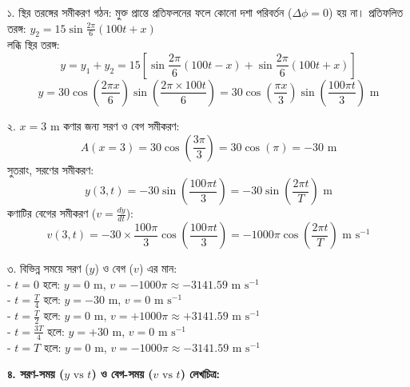 \documentclass[12pt, a4paper]{article}
\begin{document}
\begin{tcolorbox}[solutionbox={সমাধান (Solution)}]
\noindent
১. স্থির তরঙ্গের সমীকরণ গঠন: মুক্ত প্রান্তে প্রতিফলনের ফলে কোনো দশা পরিবর্তন ($\Delta \phi = 0$) হয় না। প্রতিফলিত তরঙ্গ: $y_2 = 15 \sin \frac{2\pi}{6}(100t + x)$ \\
লব্ধি স্থির তরঙ্গ:
\[ y = y_1 + y_2 = 15 \left[ \sin \frac{2\pi}{6}(100t - x) + \sin \frac{2\pi}{6}(100t + x) \right] \]
\[ y = 30 \cos\left(\frac{2\pi x}{6}\right) \sin\left(\frac{2\pi \times 100t}{6}\right) = 30 \cos\left(\frac{\pi x}{3}\right) \sin\left(\frac{100\pi t}{3}\right)\text{ m} \]

\noindent
২. $x = 3\text{ m}$ কণার জন্য সরণ ও বেগ সমীকরণ:
\[ A(x=3) = 30 \cos\left(\frac{3\pi}{3}\right) = 30 \cos(\pi) = -30\text{ m} \]
সুতরাং, সরণের সমীকরণ: 
\[ y(3, t) = -30 \sin\left(\frac{100\pi t}{3}\right) = -30 \sin\left(\frac{2\pi t}{T}\right)\text{ m} \]
কণাটির বেগের সমীকরণ ($v = \frac{dy}{dt}$):
\[ v(3, t) = -30 \times \frac{100\pi}{3} \cos\left(\frac{100\pi t}{3}\right) = -1000\pi \cos\left(\frac{2\pi t}{T}\right)\text{ m s}^{-1} \]

\noindent
৩. বিভিন্ন সময়ে সরণ ($y$) ও বেগ ($v$) এর মান: \\
- $t = 0$ হলে: $y = 0\text{ m}$, \quad $v = -1000\pi \approx -3141.59\text{ m s}^{-1}$ \\
- $t = \frac{T}{4}$ হলে: $y = -30\text{ m}$, \quad $v = 0\text{ m s}^{-1}$ \\
- $t = \frac{T}{2}$ হলে: $y = 0\text{ m}$, \quad $v = +1000\pi \approx +3141.59\text{ m s}^{-1}$ \\
- $t = \frac{3T}{4}$ হলে: $y = +30\text{ m}$, \quad $v = 0\text{ m s}^{-1}$ \\
- $t = T$ হলে: $y = 0\text{ m}$, \quad $v = -1000\pi \approx -3141.59\text{ m s}^{-1}$

\vspace{1em}
\noindent
\textbf{৪. সরণ-সময় ($y\text{ vs }t$) ও বেগ-সময় ($v\text{ vs }t$) লেখচিত্র:}

\begin{center}
\end{center}
\end{tcolorbox}
\end{document}
